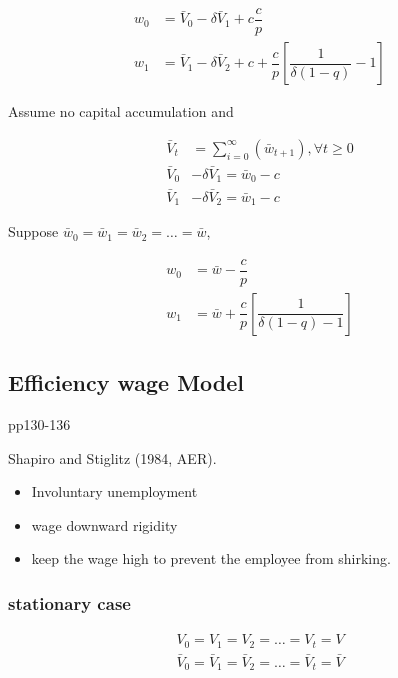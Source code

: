 \documentclass[dvipdfmx, 12pt]{article}
\begin{document}
\begin{align*}
  w_0 &= \bar{V}_0 - \delta \bar{V}_1 + c \dfrac{c}{p} \\
  w_{1} &= \bar{V}_{1} - \delta \bar{V}_{2} + c + \dfrac{c}{p} \left[ \dfrac{1}{\delta (1 - q)} - 1 \right]
\end{align*}

Assume no capital accumulation and

\begin{align*}
  \bar{V}_t &= \sum_{i = 0}^{\infty} (\bar{w}_{t + 1}), \forall t \geq 0 \\
  \bar{V}_0 &- \delta \bar{V}_1 = \bar{w}_0 - c \\
  \bar{V}_1 &- \delta \bar{V}_2 = \bar{w}_1 - c
\end{align*}

Suppose $\bar{w}_0 = \bar{w}_1 = \bar{w}_2 = \ldots =\bar{w}$,

\begin{align*}
  w_0 &= \bar{w} - \dfrac{c}{p} \\
  w_1 &= \bar{w} + \dfrac{c}{p} \left[ \dfrac{1}{\delta (1 - q) - 1} \right]
\end{align*}

\subsection{Efficiency wage Model}

pp130-136

Shapiro and Stiglitz (1984, AER).

\begin{itemize}
  \item Involuntary unemployment

  \item wage downward rigidity

  \item keep the wage high to prevent the employee from shirking.
\end{itemize}

\subsubsection{stationary case}

\begin{align*}
  V_0 = V_1 = V_2 = \ldots = V_t = V \\
  \bar{V}_0 = \bar{V}_1 = \bar{V}_2 = \ldots = \bar{V}_t = \bar{V}
\end{align*}
\end{document}
